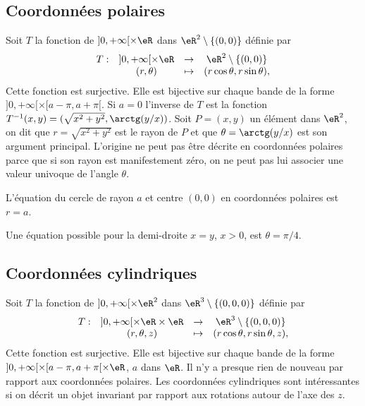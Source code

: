 \subsection{Coordonnées polaires}
Soit $T$ la fonction de $]0, +\infty[\times \eR$ dans $\eR^2\setminus\{(0,0)\}$ définie par
\begin{equation}
  \begin{array}{lccc}
    T: &]0, +\infty[\times \eR & \to & \eR^2\setminus\{(0,0)\}\\
 & (r, \theta)&\mapsto& (r\cos \theta, r \sin \theta),
  \end{array}
\end{equation}
Cette fonction est surjective. Elle est bijective sur chaque bande de la forme  $]0, +\infty[\times [a-\pi,a+\pi[$. Si $a=0$ l'inverse de $T$  est la fonction $T^{-1}(x,y)= (\sqrt{x^2+y^2}, \arctg (y/x))$. Soit $P=(x,y)$ un élément dans $\eR^2$, on dit que $r=\sqrt{x^2+y^2}$ est le rayon de $P$ et que $\theta=\arctg (y/x) $ est son argument principal. L'origine ne peut pas être décrite en coordonnées polaires parce que si son rayon est manifestement zéro, on ne peut pas lui associer une valeur univoque de l'angle $\theta$. 

\begin{example}
L'équation du cercle de rayon $a$ et centre $(0, 0)$ en coordonnées polaires est $r=a$. 
\end{example}

\begin{example}
	Une équation possible pour la demi-droite $x=y$, $x>0$,  est $\theta=\pi/4$.         
\end{example}

\subsection{Coordonnées cylindriques}
Soit $T$ la fonction de $]0, +\infty[\times \eR^2$ dans $\eR^3\setminus\{(0,0,0)\}$ définie par
\begin{equation}
  \begin{array}{lccc}
    T: &]0, +\infty[\times \eR\times \eR & \to & \eR^3\setminus\{(0,0,0)\}\\
 & (r, \theta, z)&\mapsto& (r\cos \theta, r \sin \theta, z),
  \end{array}
\end{equation}
Cette fonction est surjective. Elle est bijective sur chaque bande de la forme  $]0, +\infty[\times [a-\pi,a+\pi[\times \eR$, $a$ dans $\eR$. Il n'y a presque rien de nouveau par rapport aux coordonnées polaires. Les coordonnées  cylindriques sont intéressantes si on décrit un objet invariant par rapport aux rotations autour de l'axe des $z$. 

